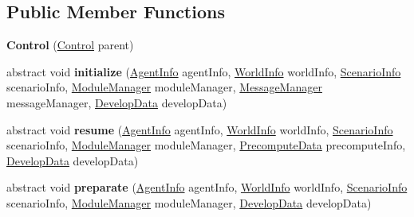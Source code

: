 \subsection*{Public Member Functions}
\begin{DoxyCompactItemize}
\item 
\hypertarget{classadf_1_1component_1_1control_1_1Control_aeaab5064a2bfb271229b3b62a91c471c}{}\label{classadf_1_1component_1_1control_1_1Control_aeaab5064a2bfb271229b3b62a91c471c} 
{\bfseries Control} (\hyperlink{classadf_1_1component_1_1control_1_1Control}{Control} parent)
\item 
\hypertarget{classadf_1_1component_1_1control_1_1Control_ad3ffe707e43a8bc5bcc531ed3244af4a}{}\label{classadf_1_1component_1_1control_1_1Control_ad3ffe707e43a8bc5bcc531ed3244af4a} 
abstract void {\bfseries initialize} (\hyperlink{classadf_1_1agent_1_1info_1_1AgentInfo}{Agent\+Info} agent\+Info, \hyperlink{classadf_1_1agent_1_1info_1_1WorldInfo}{World\+Info} world\+Info, \hyperlink{classadf_1_1agent_1_1info_1_1ScenarioInfo}{Scenario\+Info} scenario\+Info, \hyperlink{classadf_1_1agent_1_1module_1_1ModuleManager}{Module\+Manager} module\+Manager, \hyperlink{classadf_1_1agent_1_1communication_1_1MessageManager}{Message\+Manager} message\+Manager, \hyperlink{classadf_1_1agent_1_1develop_1_1DevelopData}{Develop\+Data} develop\+Data)
\item 
\hypertarget{classadf_1_1component_1_1control_1_1Control_a73afe92a2ca29fd0f6f95d542fa267df}{}\label{classadf_1_1component_1_1control_1_1Control_a73afe92a2ca29fd0f6f95d542fa267df} 
abstract void {\bfseries resume} (\hyperlink{classadf_1_1agent_1_1info_1_1AgentInfo}{Agent\+Info} agent\+Info, \hyperlink{classadf_1_1agent_1_1info_1_1WorldInfo}{World\+Info} world\+Info, \hyperlink{classadf_1_1agent_1_1info_1_1ScenarioInfo}{Scenario\+Info} scenario\+Info, \hyperlink{classadf_1_1agent_1_1module_1_1ModuleManager}{Module\+Manager} module\+Manager, \hyperlink{classadf_1_1agent_1_1precompute_1_1PrecomputeData}{Precompute\+Data} precompute\+Info, \hyperlink{classadf_1_1agent_1_1develop_1_1DevelopData}{Develop\+Data} develop\+Data)
\item 
\hypertarget{classadf_1_1component_1_1control_1_1Control_a57fc961267ee2cb0728efcbd77ce3577}{}\label{classadf_1_1component_1_1control_1_1Control_a57fc961267ee2cb0728efcbd77ce3577} 
abstract void {\bfseries preparate} (\hyperlink{classadf_1_1agent_1_1info_1_1AgentInfo}{Agent\+Info} agent\+Info, \hyperlink{classadf_1_1agent_1_1info_1_1WorldInfo}{World\+Info} world\+Info, \hyperlink{classadf_1_1agent_1_1info_1_1ScenarioInfo}{Scenario\+Info} scenario\+Info, \hyperlink{classadf_1_1agent_1_1module_1_1ModuleManager}{Module\+Manager} module\+Manager, \hyperlink{classadf_1_1agent_1_1develop_1_1DevelopData}{Develop\+Data} develop\+Data)

\end{DoxyCompactItemize}
